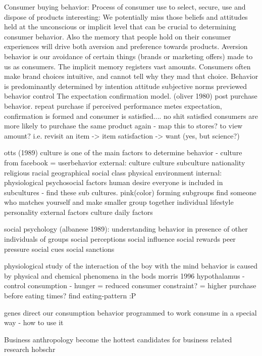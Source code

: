 Consumer buying behavior:
	Process of consumer use to select, secure, use and dispose of products
  interesting: We potentially miss those beliefs and attitudes held at the
  unconscious or implicit level that can be crucial to determining consumer
  behavior. Also the memory that people hold on their consumer experiences will
  drive both aversion and preference towards products. Aversion behavior is our
  avoidance of certain things (brands or marketing offers) made to us as
  consumers.  The implicit memory registers vast amounts. Consumers often make
  brand choices intuitive, and cannot tell why they mad that choice.
	Behavior is predominantly determined by intention
		attitude
		subjective norms
		previewed behavior control
	The expectation confirmation model. (oliver 1980)
		post purchase behavior.
		repeat purchase
		if perceived performance metes expectation, confirmation is formed and consumer
        is satisfied.... no shit
      satisfied consumers are more likely to purchase the same product again -
      map this to stores? to view amount? i.e. revisit an item -> item
      satisfaction -> want (yes, but science?)

otts (1989)
	culture is one of the main factors to determine behavior - culture from facebook = userbehavior
	external:
		culture
			culture
			subculture
				nationality
				religious
				racial
				geographical
			social class
		physical environment
	internal:
		physiological
		psychosocial factors
			human desire
	everyone is included in subcultures - find these sub cultures. pink(color)
	forming subgroups
		find someone who matches yourself and make smaller group together
	individual lifestyle
		personality
		external factors
			culture
			daily factors

social psychology (albanese 1989):
	understanding behavior in presence of other individuals of groups
	social perceptions
	social influence
	social rewards
	peer pressure
	social cues
	social sanctions

physiological
	study of the interaction of the boy with the mind
	behavior is caused by physical and chemical phenomena in the bods morris 1996
	hypothalamus - control consumption - hunger = reduced consumer constraint? = higher purchase before eating times? find eating-pattern :P

genes direct our consumption behavior
	programmed to work consume in a special way - how to use it

Business anthropology
	become the hottest candidates for business related research hobschr

